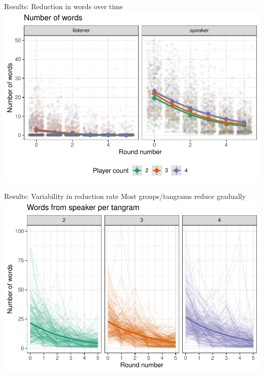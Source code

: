 \documentclass[ 12pt, xcolor=beamer,table,usenames,dvipsnames, ignorenonframetext, ngerman]{beamer}
\begin{document}
\begin{frame}{Results: Reduction in words over time}
\includegraphics[width=\textwidth]{../images/words.pdf}


\end{frame}

\begin{frame}{Results: Variability in reduction rate}
	Most groups/tangrams reduce gradually
	\includegraphics[width=\textwidth]{../images/words_lines.pdf}
\end{frame}
\end{document}
